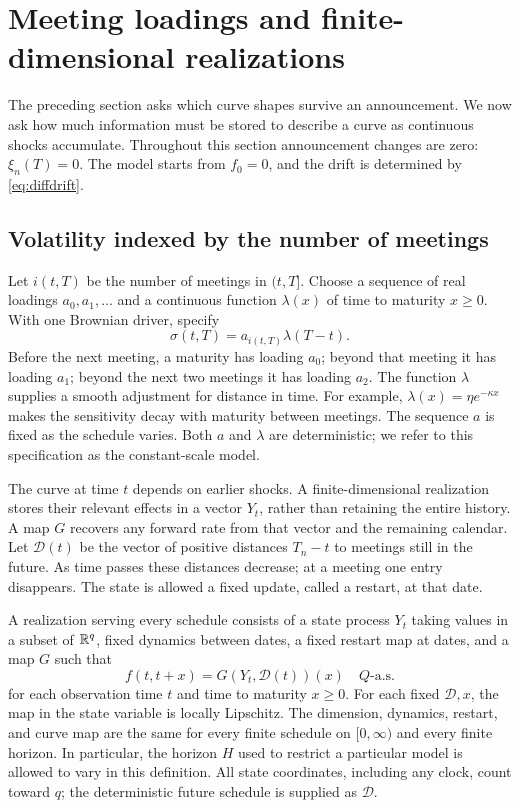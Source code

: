 \section{Meeting loadings and finite-dimensional realizations}\label{sec:realizations}
The preceding section asks which curve shapes survive an announcement. We now ask how much information must be stored to describe a curve as continuous shocks accumulate. Throughout this section announcement changes are zero: $\xi_n(T)=0$. The model starts from $f_0=0$, and the drift is determined by \eqref{eq:diffdrift}.

\subsection{Volatility indexed by the number of meetings}
Let $i(t,T)$ be the number of meetings in $(t,T]$. Choose a sequence of real loadings $a_0,a_1,\ldots$ and a continuous function $\lambda(x)$ of time to maturity $x\ge0$. With one Brownian driver, specify
\begin{equation}
\sigma(t,T)=a_{i(t,T)}\lambda(T-t).\label{eq:ordinal}
\end{equation}
Before the next meeting, a maturity has loading $a_0$; beyond that meeting it has loading $a_1$; beyond the next two meetings it has loading $a_2$. The function $\lambda$ supplies a smooth adjustment for distance in time. For example, $\lambda(x)=\eta e^{-\kappa x}$ makes the sensitivity decay with maturity between meetings. The sequence $a$ is fixed as the schedule varies. Both $a$ and $\lambda$ are deterministic; we refer to this specification as the constant-scale model.

The curve at time $t$ depends on earlier shocks. A finite-dimensional realization stores their relevant effects in a vector $Y_t$, rather than retaining the entire history. A map $G$ recovers any forward rate from that vector and the remaining calendar. Let $\mathcal D(t)$ be the vector of positive distances $T_n-t$ to meetings still in the future. As time passes these distances decrease; at a meeting one entry disappears. The state is allowed a fixed update, called a restart, at that date.

\begin{definition}\label{def:realization}
A realization serving every schedule consists of a state process $Y_t$ taking values in a subset of $\mathbb R^q$, fixed dynamics between dates, a fixed restart map at dates, and a map $G$ such that
\[
f(t,t+x)=G(Y_t,\mathcal D(t))(x)\quad Q\text{-a.s.}
\]
for each observation time $t$ and time to maturity $x\ge0$. For each fixed $\mathcal D,x$, the map in the state variable is locally Lipschitz. The dimension, dynamics, restart, and curve map are the same for every finite schedule on $[0,\infty)$ and every finite horizon. In particular, the horizon $H$ used to restrict a particular model is allowed to vary in this definition. All state coordinates, including any clock, count toward $q$; the deterministic future schedule is supplied as $\mathcal D$.
\end{definition}

